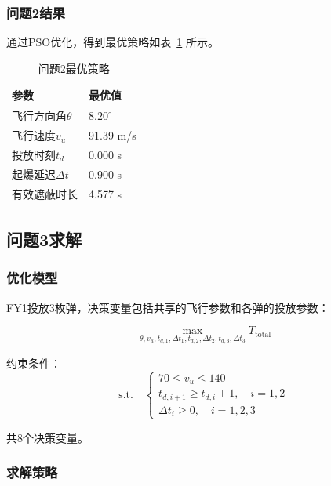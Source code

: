 \documentclass[12pt,a4paper]{article}
\begin{document}
\subsubsection{问题2结果}

通过PSO优化，得到最优策略如表~\ref{tab:q2_result} 所示。

\begin{table}[H]
    \centering
    \caption{问题2最优策略}
    \label{tab:q2_result}
    \begin{tabular}{ll}
        \toprule
        参数 & 最优值 \\
        \midrule
        飞行方向角$\theta$ & $8.20^\circ$ \\
        飞行速度$v_u$ & 91.39 m/s \\
        投放时刻$t_d$ & 0.000 s \\
        起爆延迟$\Delta t$ & 0.900 s \\
        \midrule
        有效遮蔽时长 & 4.577 s \\
        \bottomrule
    \end{tabular}
\end{table}

\subsection{问题3求解}

\subsubsection{优化模型}

FY1投放3枚弹，决策变量包括共享的飞行参数和各弹的投放参数：

\begin{equation}
    \max_{\theta, v_u, t_{d,1}, \Delta t_1, t_{d,2}, \Delta t_2, t_{d,3}, \Delta t_3} T_{\text{total}}
\end{equation}

约束条件：
\begin{equation}
    \text{s.t.} \quad \begin{cases}
        70 \leq v_u \leq 140 \\
        t_{d,i+1} \geq t_{d,i} + 1, \quad i = 1, 2 \\
        \Delta t_i \geq 0, \quad i = 1, 2, 3
    \end{cases}
\end{equation}

共8个决策变量。

\subsubsection{求解策略}
\end{document}
